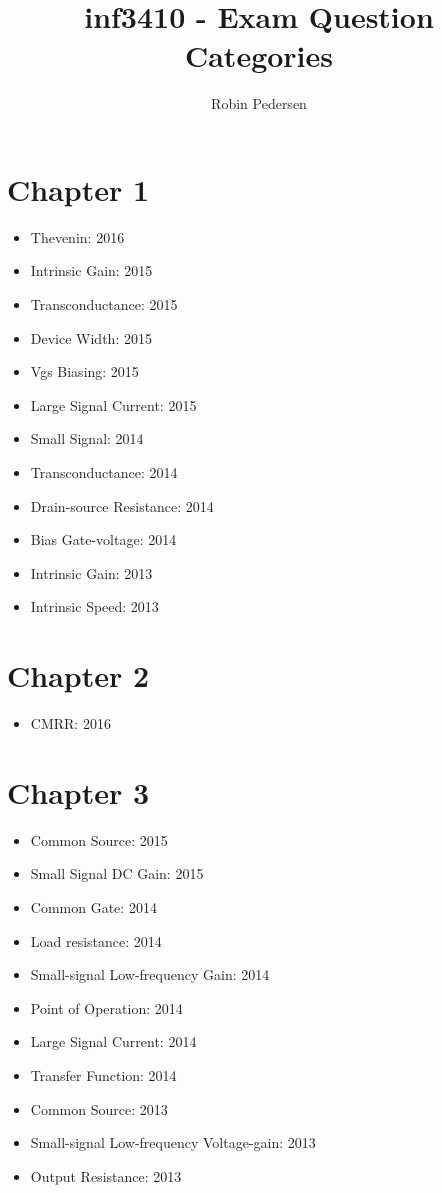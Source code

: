 \documentclass[twocolumn]{article}
\begin{document}
  \title{inf3410 - Exam Question Categories}
  \author{Robin Pedersen}
  \maketitle

  \section*{Chapter 1}
    \begin{itemize}
      \item Thevenin: 2016

      \item Intrinsic Gain: 2015
      \item Transconductance: 2015
      \item Device Width: 2015
      \item Vgs Biasing: 2015
      \item Large Signal Current: 2015

      \item Small Signal: 2014
      \item Transconductance: 2014
      \item Drain-source Resistance: 2014
      \item Bias Gate-voltage: 2014

      \item Intrinsic Gain: 2013
      \item Intrinsic Speed: 2013
    \end{itemize}
  \section*{Chapter 2}
    \begin{itemize}
      \item CMRR: 2016
    \end{itemize}
  \section*{Chapter 3}
    \begin{itemize}
      \item Common Source: 2015
      \item Small Signal DC Gain: 2015

      \item Common Gate: 2014
      \item Load resistance: 2014
      \item Small-signal Low-frequency Gain: 2014
      \item Point of Operation: 2014
      \item Large Signal Current: 2014
      \item Transfer Function: 2014

      \item Common Source: 2013
      \item Small-signal Low-frequency Voltage-gain: 2013
      \item Output Resistance: 2013
    \end{itemize}
\end{document}
